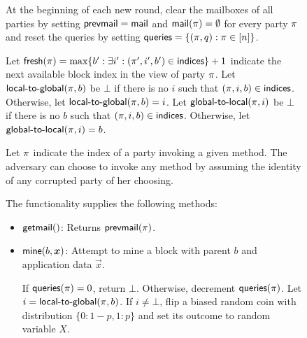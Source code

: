 \begin{figure*}
{\begin{minipage}{0.9 \textwidth}
  At the beginning of each new round, clear the mailboxes of
  all parties by setting $\textsf{prevmail} = \textsf{mail}$ and $\textsf{mail}(\pi) = \emptyset$ for
  every party $\pi$ and reset the queries by setting
  $\textsf{queries} = \{(\pi, q): \pi \in [n]\}$.

  Let $\textsf{fresh}(\pi) = \max\{b': \exists i': (\pi', i', b') \in \textsf{indices}\} +
  1$ indicate the next available block index in the view of party $\pi$. Let
  $\textsf{local-to-global}(\pi, b)$ be $\bot$ if there is no $i$ such that $(\pi, i, b) \in
  \textsf{indices}$. Otherwise, let $\textsf{local-to-global}(\pi, b) = i$. Let
  $\textsf{global-to-local}(\pi, i)$ be $\bot$ if there is no $b$ such that
  $(\pi, i, b) \in \textsf{indices}$. Otherwise, let $\textsf{global-to-local}(\pi, i) = b$.

  Let $\pi$ indicate the index of a party invoking a given method. The
  adversary can choose to invoke any method by assuming the identity of any
  corrupted party of her choosing.

  The functionality supplies the following methods:

	\begin{itemize}
      \item $\textsf{getmail}()$:
            Returns $\textsf{prevmail}(\pi)$.
			\item $\mine(b, \vec{x})$:
            Attempt to mine a block with parent $b$ and application data
            $\vec{x}$.

            If $\textsf{queries}(\pi) = 0$, return $\bot$. Otherwise,
            decrement $\textsf{queries}(\pi)$.
            Let $i = \textsf{local-to-global}(\pi, b)$. If $i \neq \bot$, flip a
            biased random coin with distribution $\{0: 1 - p, 1: p\}$ and set
            its outcome to random variable $X$.


\end{itemize}
\end{minipage}}
\end{figure*}
